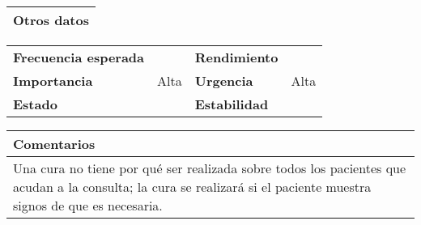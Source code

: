 \documentclass[11pt,a4paper]{article}
\begin{document}
\begin{table}[H]
	\begin{tabularx}{\textwidth}{X}
		\textbf{Otros datos}\\ \hline
	\end{tabularx}
	\begin{tabularx}{\textwidth}{lXlX}
		\textbf{Frecuencia esperada} &  & \textbf{Rendimiento} & \\
		\textbf{Importancia} & Alta & \textbf{Urgencia} & Alta \\
		\textbf{Estado} &  & \textbf{Estabilidad} & \\
	\end{tabularx}
	
	\bigskip
	
	\begin{tabularx}{\textwidth}{X}
		\textbf{Comentarios}\\ \hline
		Una cura no tiene por qué ser realizada sobre todos los pacientes que acudan a la consulta; la cura se realizará si el paciente muestra signos de que es necesaria. \\
	\end{tabularx}
\end{table}

\newpage




\end{document}
